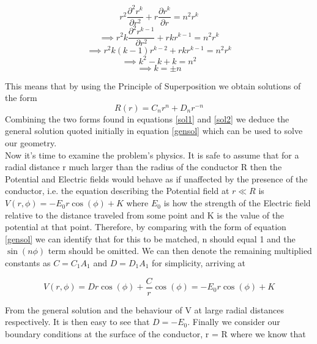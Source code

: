 \documentclass[a4paper]{article}
\begin{document}
\begin{equation}r^2\frac{\partial^2r^k}{\partial r^2}+r\frac{\partial r^k}{\partial r} = n^2r^k \end{equation}
\begin{equation}\implies r^2k\frac{\partial^2r^{k-1}}{\partial r^2}+rkr^{k-1} = n^2r^k \end{equation}
\begin{equation}\implies r^2k(k-1)r^{k-2} + rkr^{k-1} = n^2r^k \end{equation}
\begin{equation}\implies k^2 - k + k = n^2\end{equation}
\begin{equation}\implies k = \pm n\end{equation}

\newpage
This means that by using the Principle of Superposition we obtain solutions of the form 
\begin{equation}\label{sol2}
R(r)=C_nr^n + D_nr^{-n}
\end{equation} 
Combining the two forms found in equations \ref{sol1} and \ref{sol2} we deduce the general solution quoted initially in equation \ref{gensol} which can be used to solve our geometry.\\

Now it's time to examine the problem's physics. It is safe to assume that for a radial distance r much larger than the radius of the conductor R then the Potential and Electric fields would behave as if unaffected by the presence of the conductor, i.e. the equation describing the Potential field at $r\ll R$ is $V(r,\phi) = -E_0 r\cos(\phi) + K$ where $E_0$ is how the strength of the Electric field relative to the distance traveled from some point and K is the value of the potential at that point. Therefore, by comparing with the form of equation \ref{gensol} we can identify that for this to be matched, n should equal 1 and the $\sin(n\phi)$ term should be omitted. We can then denote the remaining multiplied constants as $C = C_1A_1$ and $D=D_1A_1$ for simplicity, arriving at

\begin{equation}V(r,\phi) = Dr\cos(\phi) + \frac{C}{r}\cos(\phi) = -E_0 r\cos(\phi) + K \end{equation}

From the general solution and the behaviour of V at large radial distances respectively. It is then easy to see that $D = -E_0$. Finally we consider our boundary conditions at the surface of the conductor, r = R where we know that
\end{document}

